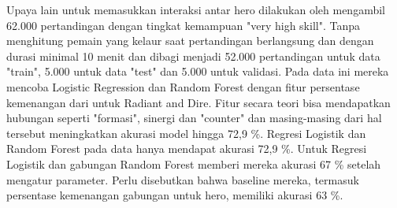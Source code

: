 \documentclass[skripsi]{ugmskripsi}
\begin{document}
Upaya lain untuk memasukkan interaksi antar hero dilakukan oleh \citep{kin} mengambil 62.000 pertandingan dengan tingkat kemampuan "very high skill". Tanpa menghitung pemain yang kelaur saat pertandingan berlangsung dan dengan durasi minimal 10 menit dan dibagi menjadi 52.000 pertandingan untuk data "train", 5.000 untuk data "test" dan 5.000 untuk validasi. Pada data ini mereka mencoba Logistic Regression dan Random Forest dengan fitur persentase kemenangan dari untuk Radiant and Dire. Fitur secara teori bisa mendapatkan hubungan seperti "formasi",
sinergi dan "counter" dan masing-masing dari hal tersebut meningkatkan akurasi model hingga 72,9 \%. Regresi Logistik dan Random Forest pada data  hanya mendapat akurasi  72,9 \%. Untuk Regresi Logistik dan gabungan Random Forest  memberi mereka akurasi 67 \% setelah mengatur parameter. Perlu disebutkan bahwa baseline mereka, termasuk persentase kemenangan gabungan  untuk hero, memiliki akurasi 63 \%.
\end{document}
